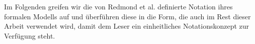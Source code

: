 

Im Folgenden greifen wir die von Redmond et al. definierte Notation ihres formalen Modells auf und überführen diese in die Form, die auch im Rest dieser Arbeit verwendet wird, damit dem Leser ein einheitliches Notationskonzept zur Verfügung steht.





